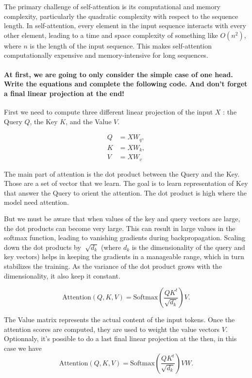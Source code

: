 The primary challenge of self-attention is its computational and memory complexity, particularly the quadratic complexity with respect to the sequence length. In self-attention, every element in the input sequence interacts with every other element, leading to a time and space complexity of something like $ O(n^2) $, where $n$ is the length of the input sequence. This makes self-attention computationally expensive and memory-intensive for long sequences.

\paragraph{At first, we are going to only consider the simple case of one head. Write the equations and complete the following code. And don't forget a final linear projection at the end!}

First we need to compute three different linear projection of the input $ X $ : the Query $ Q $, the Key $ K $, and the Value $ V $.

\begin{align*}
    Q & = X W_q, \\
    K & = X W_k, \\
    V & = X W_v
\end{align*}

The main part of attention is the dot product between the Query and the Key. Those are a set of vector that we learn. The goal is to learn representation of Key that answer the Query to orient the attention. The dot product is high where the model need attention.

But we must be aware that when values of the key and query vectors are large, the dot products can become very large. This can result in large values in the softmax function, leading to vanishing gradients during backpropagation. Scaling down the dot products by $ \sqrt[]{d_k} $ (where $ d_k $  is the dimensionality of the query and key vectors) helps in keeping the gradients in a manageable range, which in turn stabilizes the training. As the variance of the dot product grows with the dimensionality, it also keep it constant.

\[
    \text{Attention}(Q, K, V) = \text{Softmax}\left(\frac{QK^t}{\sqrt{d_k}}\right)V
.\]

The Value matrix represents the actual content of the input tokens. Once the attention scores are computed, they are used to weight the value vectors $ V $. Optionnaly, it's possible to do a last final linear projection at the then, in this case we have 
\[
    \text{Attention}(Q, K, V) = \text{Softmax}\left(\frac{QK^t}{\sqrt{d_k}}\right)V W
.\]


